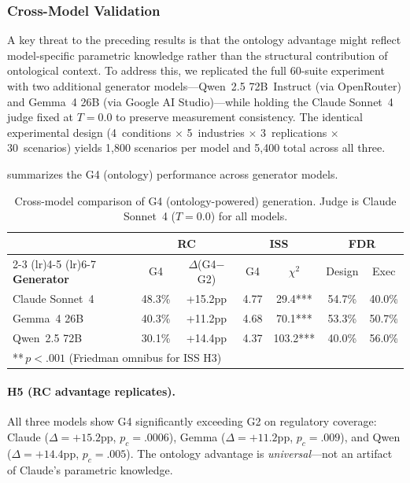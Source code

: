\documentclass[11pt,a4paper]{article}
\begin{document}
\subsubsection{Cross-Model Validation}
\label{sec:crossmodel}

A key threat to the preceding results is that the ontology advantage
might reflect model-specific parametric knowledge rather than the
structural contribution of ontological context. To address this, we
replicated the full 60-suite experiment with two additional generator
models---Qwen~2.5 72B~Instruct (via OpenRouter) and Gemma~4 26B
(via Google AI Studio)---while holding the Claude Sonnet~4 judge
fixed at $T{=}0.0$ to preserve measurement consistency. The identical
experimental design (4~conditions $\times$ 5~industries $\times$
3~replications $\times$ 30~scenarios) yields 1,800 scenarios per
model and 5,400 total across all three.

 summarizes the G4 (ontology) performance
across generator models.

\begin{table}[ht]
\centering
\caption{Cross-model comparison of G4 (ontology-powered) generation.
Judge is Claude Sonnet~4 ($T{=}0.0$) for all models.}
\label{tab:crossmodel}
\small
\begin{tabular}{lcccccc}
\toprule
& \multicolumn{2}{c}{\textbf{RC}} & \multicolumn{2}{c}{\textbf{ISS}} & \multicolumn{2}{c}{\textbf{FDR}} \\
\cmidrule(lr){2-3} \cmidrule(lr){4-5} \cmidrule(lr){6-7}
\textbf{Generator} & G4 & $\Delta$(G4$-$G2) & G4 & $\chi^2$ & Design & Exec \\
\midrule
Claude Sonnet~4 & 48.3\% & +15.2pp & 4.77 & 29.4*** & 54.7\% & 40.0\% \\
Gemma~4 26B     & 40.3\% & +11.2pp & 4.68 & 70.1*** & 53.3\% & 50.7\% \\
Qwen~2.5 72B    & 30.1\% & +14.4pp & 4.37 & 103.2*** & 40.0\% & 56.0\% \\
\bottomrule
\multicolumn{7}{l}{\footnotesize ***\,$p < .001$ (Friedman omnibus for ISS H3)}
\end{tabular}
\end{table}

\paragraph{H5 (RC advantage replicates).}
All three models show G4 significantly exceeding G2 on regulatory
coverage: Claude ($\Delta{=}+15.2$pp, $p_c{=}.0006$), Gemma
($\Delta{=}+11.2$pp, $p_c{=}.009$), and Qwen
($\Delta{=}+14.4$pp, $p_c{=}.005$). The ontology advantage is
\emph{universal}---not an artifact of Claude's parametric knowledge.
\end{document}

